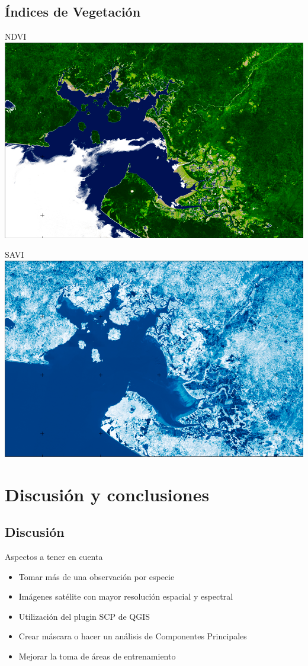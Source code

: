 \documentclass[12pt]{beamer}
\begin{document}
\subsection{Índices de Vegetación}
\begin{frame}{\footnotesize NDVI}
	\centering
	\includegraphics[width=0.8\linewidth]{./Imagenes/NDVI.png}
\end{frame}

\begin{frame}{\footnotesize SAVI}
	\centering
	\includegraphics[width=0.8\linewidth]{./Imagenes/SAVI.png}
\end{frame}

\section{Discusión y conclusiones}
\subsection{Discusión}
\begin{frame}
	\begin{block}{Aspectos a tener en cuenta}
		\begin{itemize}[<+->]
			\item Tomar más de una observación por especie
			\item Imágenes satélite con mayor resolución espacial y espectral
			\item Utilización del plugin SCP de QGIS
			\item Crear máscara o hacer un análisis de Componentes Principales
			\item Mejorar la toma de áreas de entrenamiento
		\end{itemize}
	\end{block}
\end{frame}
\end{document}
